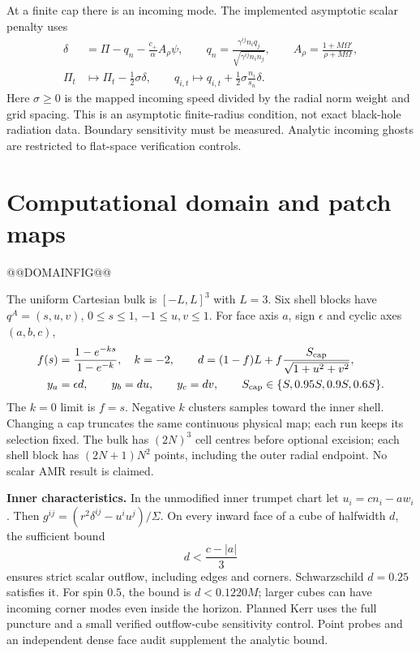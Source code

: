 \documentclass[11pt,letterpaper]{article}
\begin{document}
At a finite cap there is an incoming mode. The implemented asymptotic scalar penalty uses
\begin{align}
 \delta&=\Pi-q_n-\frac{c_+}{\alpha}A_\rho\psi,\qquad
 q_n=\frac{\gamma^{ij}n_iq_j}{\sqrt{\gamma^{ij}n_in_j}},\qquad
 A_\rho=\frac{1+M\Omega'}{\rho+M\Omega},\\
 \Pi_t&\longmapsto\Pi_t-\tfrac12\sigma\delta,\qquad
 q_{i,t}\longmapsto q_{i,t}+\tfrac12\sigma\frac{n_i}{s_n}\delta.
\end{align}
Here $\sigma\geq0$ is the mapped incoming speed divided by the radial norm weight and grid spacing. This is an asymptotic finite-radius condition, not exact black-hole radiation data. Boundary sensitivity must be measured. Analytic incoming ghosts are restricted to flat-space verification controls.

\clearpage
\section{Computational domain and patch maps}
@@DOMAINFIG@@

The uniform Cartesian bulk is $[-L,L]^3$ with $L=3$. Six shell blocks have $q^A=(s,u,v)$, $0\leq s\leq1$, $-1\leq u,v\leq1$. For face axis $a$, sign $\epsilon$ and cyclic axes $(a,b,c)$,
\begin{align}
 f(s)&=\frac{1-e^{-k s}}{1-e^{-k}},\quad k=-2,\qquad
 d=(1-f)L+f\frac{S_{\rm cap}}{\sqrt{1+u^2+v^2}},\\
 y_a&=\epsilon d,\qquad y_b=du,\qquad y_c=dv,\qquad S_{\rm cap}\in\{S,0.95S,0.9S,0.6S\}.
\end{align}
The $k=0$ limit is $f=s$. Negative $k$ clusters samples toward the inner shell. Changing a cap truncates the same continuous physical map; each run keeps its selection fixed. The bulk has $(2N)^3$ cell centres before optional excision; each shell block has $(2N+1)N^2$ points, including the outer radial endpoint. No scalar AMR result is claimed.

\textbf{Inner characteristics.} In the unmodified inner trumpet chart let $u_i=cn_i-aw_i$. Then $g^{ij}=(r^2\delta^{ij}-u^iu^j)/\Sigma$. On every inward face of a cube of halfwidth $d$, the sufficient bound
\begin{equation}
 d<\frac{c-|a|}{3}
\end{equation}
ensures strict scalar outflow, including edges and corners. Schwarzschild $d=0.25$ satisfies it. For spin $0.5$, the bound is $d<0.1220M$; larger cubes can have incoming corner modes even inside the horizon. Planned Kerr uses the full puncture and a small verified outflow-cube sensitivity control. Point probes and an independent dense face audit supplement the analytic bound.
\end{document}
